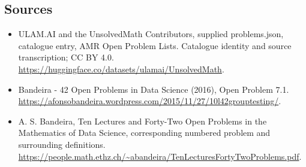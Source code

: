 \documentclass[11pt,a4paper]{article}
\begin{document}
\subsection{Sources}
\begin{itemize}
\item[S1] ULAM.AI and the UnsolvedMath Contributors, supplied problems.json, catalogue entry, AMR Open Problem Lists. Catalogue identity and source transcription; CC BY 4.0.
\url{https://huggingface.co/datasets/ulamai/UnsolvedMath}.
\item[S2] Bandeira - 42 Open Problems in Data Science (2016), Open Problem 7.1. 
\url{https://afonsobandeira.wordpress.com/2015/11/27/10l42grouptesting/}.
\item[S3] A. S. Bandeira, Ten Lectures and Forty-Two Open Problems in the Mathematics of Data Science, corresponding numbered problem and surrounding definitions.
\url{https://people.math.ethz.ch/~abandeira/TenLecturesFortyTwoProblems.pdf}.
\end{itemize}
\end{document}
